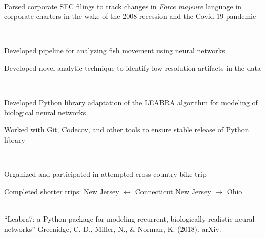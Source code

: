 \documentclass[a4paper]{MagicalCV}
\begin{document}
\begin{minipage}[t]{0.66\textwidth}
 \\
\vspace{\topsep} %
\begin{tightemize}
\item Parsed corporate SEC filings to track changes in \textit{Force majeure} language in corporate charters in the wake of the 2008 recession and the Covid-19 pandemic
\end{tightemize}
\sectionsep

 \\
\vspace{\topsep} %
\begin{tightemize}
\item Developed pipeline for analyzing fish movement using neural networks
\item Developed novel analytic technique to identify low-resolution artifacts in the data
\end{tightemize}
\sectionsep

 \\
\vspace{\topsep} %
\begin{tightemize}
\item Developed Python library adaptation of the LEABRA algorithm for modeling of biological neural networks
\item Worked with Git, Codecov, and other tools to ensure stable release of Python library
\end{tightemize}
\sectionsep


 \\
\vspace{\topsep} %
\begin{tightemize}
\item Organized and participated in attempted cross country bike trip
\item Completed shorter trips:
    \subitem New Jersey $\longleftrightarrow$ Connecticut
    \subitem New Jersey $\rightarrow$ Ohio
\end{tightemize}
\sectionsep

 \\
“Leabra7: a Python package for modeling recurrent, biologically-realistic neural networks” Greenidge, C. D., Miller, N., \& Norman, K. (2018). arXiv.
\end{minipage} 
\end{document}
